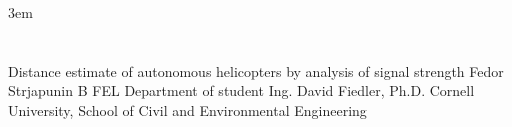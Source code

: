 \documentclass[12pt,a4paper]{article}
\begin{document}
\emergencystretch 3em %

\renewcommand{\reviewlanguage}{EN}
\renewcommand{\reporttype}{REV}

\syncLanguage
\section{\protect\Identification}
\begin{center}
  \IdentificationDetail
    {Distance estimate of autonomous helicopters by analysis of signal strength} %
    {Fedor Strjapunin} %
    {B} %
    {FEL} %
    {Department of student} %
    {Ing. David Fiedler, Ph.D.} %
    {Cornell University, School of Civil and Environmental Engineering} %
  
\end{center}


\end{document}

